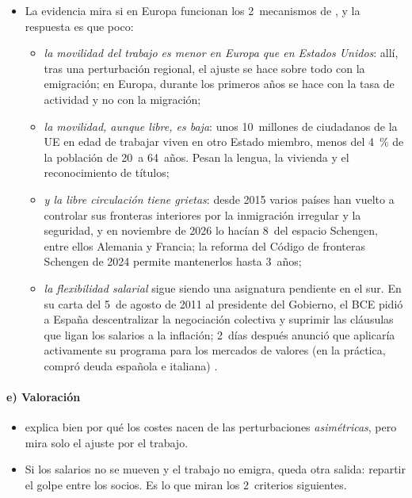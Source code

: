 \documentclass[11pt]{article}
\begin{document}
\begin{itemize}
\item La evidencia mira si en Europa funcionan los 2~mecanismos de , y la respuesta es que poco:
  \begin{itemize}
  \item \emph{la movilidad del trabajo es menor en Europa que en Estados Unidos}: allí, tras una perturbación regional, el ajuste se hace sobre todo con la emigración\nocite{BlanchardKatz1992Regional}; en Europa, durante los primeros años se hace con la tasa de actividad y no con la migración\nocite{DecressinFatas1995Regional};
  \item \emph{la movilidad, aunque libre, es baja}: unos 10~millones de ciudadanos de la UE en edad de trabajar viven en otro Estado miembro, menos del 4~\% de la población de 20~a 64~años\nocite{Eurostat2026MigrPop}. Pesan la lengua, la vivienda y el reconocimiento de títulos;
  \item \emph{y la libre circulación tiene grietas}: desde 2015 varios países han vuelto a controlar sus fronteras interiores por la inmigración irregular y la seguridad, y en noviembre de 2026 lo hacían 8~del espacio Schengen, entre ellos Alemania y Francia\nocite{CE2026ControlesSchengen}; la reforma del Código de fronteras Schengen de 2024 permite mantenerlos hasta 3~años\nocite{UE2024Reglamento1717};
  \item \emph{la flexibilidad salarial} sigue siendo una asignatura pendiente en el sur. En su carta del 5~de agosto de 2011 al presidente del Gobierno, el BCE pidió a España descentralizar la negociación colectiva y suprimir las cláusulas que ligan los salarios a la inflación\nocite{BCE2011CartaEspana}; 2~días después anunció que aplicaría activamente su programa para los mercados de valores (en la práctica, compró deuda española e italiana)\nocite{BCE2011Declaracion} .
  \end{itemize}
\end{itemize}

\paragraph{e) Valoración}

\begin{itemize}
\item {} explica bien por qué los costes nacen de las perturbaciones \emph{asimétricas}, pero mira solo el ajuste por el trabajo.
\item Si los salarios no se mueven y el trabajo no emigra, queda otra salida: repartir el golpe entre los socios. Es lo que miran los 2~criterios siguientes.
\end{itemize}
\end{document}
